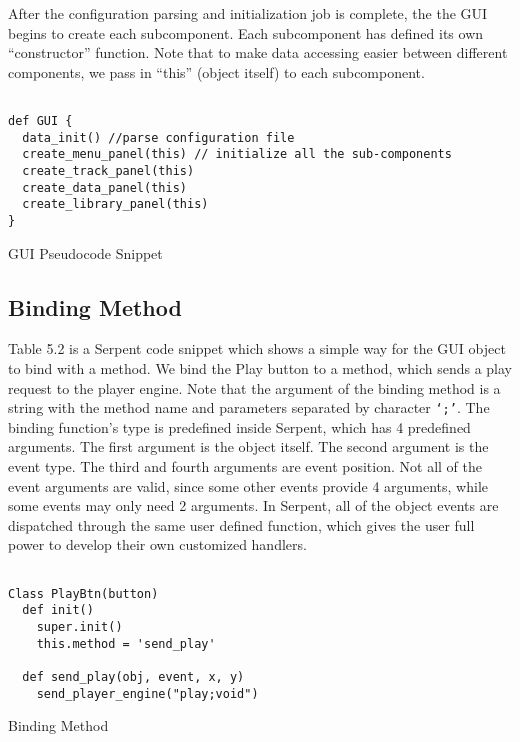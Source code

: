After the configuration parsing and initialization job is complete, the 
the GUI begins to create each subcomponent. Each subcomponent has defined its 
own ``constructor'' function. Note that to make data accessing easier 
between different components, we pass in ``this'' (object itself) to each  
subcomponent.
\begin{table}[htdp]
\centering
\begin{lstlisting}

def GUI {
  data_init() //parse configuration file
  create_menu_panel(this) // initialize all the sub-components
  create_track_panel(this)
  create_data_panel(this)
  create_library_panel(this)
}

\end{lstlisting}
\caption[GUI Pseudocode Snippet]{GUI Pseudocode Snippet}
\end{table}

\subsection{Binding Method}
Table 5.2 is a Serpent code snippet which shows a simple way for the GUI object 
to bind with a method. We bind the Play button to a method, which sends a play 
request to the player engine. Note that the argument of the binding method is 
a string with the method name and parameters
separated by character \texttt{`;'}. The binding function's type is predefined 
inside Serpent, which has 4 predefined arguments. The first argument is the object 
itself. The second argument is the event type. The third and fourth arguments are 
event position.
Not all of the event arguments are valid, since some other events provide 4 arguments, 
while some events may only need 2 arguments. In Serpent, all of the object events 
are dispatched through the same user defined function, which gives the user full 
power to develop their own customized handlers.

\begin{table}[htdp]
\centering
\begin{lstlisting}

Class PlayBtn(button)
  def init()
    super.init()
    this.method = 'send_play'

  def send_play(obj, event, x, y)
    send_player_engine("play;void")

\end{lstlisting}
\caption[Binding Method]{Binding Method}
\end{table}

